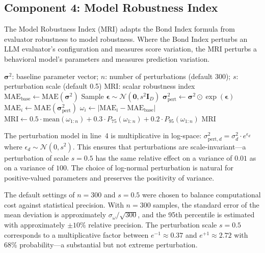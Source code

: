 \documentclass[12pt]{article}
\newcommand{\MAE}{\mathrm{MAE}}
\newcommand{\MRI}{\mathrm{MRI}}
\begin{document}
\subsection{Component 4: Model Robustness Index}

The Model Robustness Index (MRI) adapts the Bond Index formula \cite{bond2026geometric} from evaluator robustness to model robustness.  Where the Bond Index perturbs an LLM evaluator's configuration and measures score variation, the MRI perturbs a behavioral model's parameters and measures prediction variation.

\begin{algorithm}[H]
\caption{\textsc{ModelRobustnessIndex}$(\boldsymbol{\sigma}^2, n, s)$}
\label{alg:mri}
\begin{algorithmic}[1]
\REQUIRE $\boldsymbol{\sigma}^2$: baseline parameter vector; $n$: number of perturbations (default 300); $s$: perturbation scale (default 0.5)
\ENSURE $\MRI$: scalar robustness index
\STATE $\MAE_{\mathrm{base}} \leftarrow \MAE(\boldsymbol{\sigma}^2)$
    \STATE Sample $\boldsymbol{\epsilon} \sim \mathcal{N}(\mathbf{0}, s^2 \mathbf{I}_D)$ 
    \STATE $\boldsymbol{\sigma}_{\mathrm{pert}}^2 \leftarrow \boldsymbol{\sigma}^2 \odot \exp(\boldsymbol{\epsilon})$ 
    \STATE $\MAE_i \leftarrow \MAE(\boldsymbol{\sigma}_{\mathrm{pert}}^2)$
    \STATE $\omega_i \leftarrow |\MAE_i - \MAE_{\mathrm{base}}|$
\ENDFOR
\STATE $\MRI \leftarrow 0.5 \cdot \mathrm{mean}(\omega_{1:n}) + 0.3 \cdot P_{75}(\omega_{1:n}) + 0.2 \cdot P_{95}(\omega_{1:n})$
\RETURN $\MRI$
\end{algorithmic}
\end{algorithm}

The perturbation model in line~4 is multiplicative in log-space: $\sigma_{\mathrm{pert},d}^2 = \sigma_d^2 \cdot e^{\epsilon_d}$ where $\epsilon_d \sim \mathcal{N}(0, s^2)$.  This ensures that perturbations are scale-invariant---a perturbation of scale $s = 0.5$ has the same relative effect on a variance of $0.01$ as on a variance of $100$.  The choice of log-normal perturbation is natural for positive-valued parameters and preserves the positivity of variance.

The default settings of $n = 300$ and $s = 0.5$ were chosen to balance computational cost against statistical precision.  With $n = 300$ samples, the standard error of the mean deviation is approximately $\sigma_\omega / \sqrt{300}$, and the 95th percentile is estimated with approximately $\pm 10\%$ relative precision.  The perturbation scale $s = 0.5$ corresponds to a multiplicative factor between $e^{-1} \approx 0.37$ and $e^{+1} \approx 2.72$ with 68\% probability---a substantial but not extreme perturbation.
\end{document}
